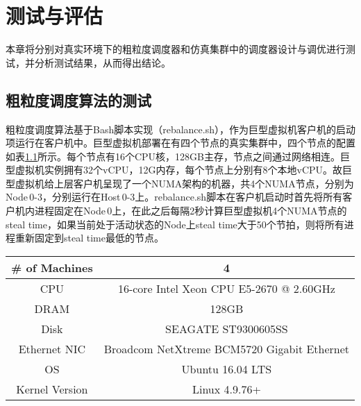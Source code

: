
\chapter{测试与评估}
本章将分别对真实环境下的粗粒度调度器和仿真集群中的调度器设计与调优进行测试，并分析测试结果，从而得出结论。

\section{粗粒度调度算法的测试}
粗粒度调度算法基于Bash脚本实现（rebalance.sh），作为巨型虚拟机客户机的启动项运行在客户机中。巨型虚拟机部署在有四个节点的真实集群中，四个节点的配置如表\ref{tab:config}所示。每个节点有16个CPU核，128GB主存，节点之间通过网络相连。巨型虚拟机实例拥有32个vCPU，12G内存，每个节点上分别有8个本地vCPU。故巨型虚拟机给上层客户机呈现了一个NUMA架构的机器，共4个NUMA节点，分别为Node\,0-3，分别运行在Host\,0-3上。rebalance.sh脚本在客户机启动时首先将所有客户机内进程固定在Node\,0上，在此之后每隔2秒计算巨型虚拟机4个NUMA节点的steal time，如果当前处于活动状态的Node上steal time大于50个节拍，则将所有进程重新固定到steal time最低的节点。
\begin{table}[!htpb]
  \label{tab:config}
  \centering
  \begin{threeparttable}[b]
     \begin{tabular}{c|c}
      \toprule
      \# of Machines & 4  \\
      \hline
      CPU & 16-core Intel Xeon CPU E5-2670 @ 2.60GHz  \\
      \hline
      DRAM & 128GB \\
      \hline
      Disk & SEAGATE ST9300605SS \\
      \hline
      Ethernet NIC & Broadcom NetXtreme BCM5720 Gigabit Ethernet \\
      \hline
      OS & Ubuntu 16.04 LTS \\
      \hline
      Kernel Version & Linux 4.9.76+ \\
      \bottomrule
    \end{tabular}
  \end{threeparttable}
\end{table}

